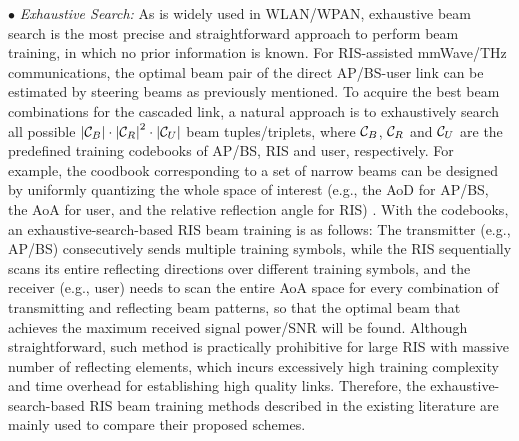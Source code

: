 \documentclass[journal,comsoc]{IEEEtran}
\begin{document}
$\bullet$ \emph{Exhaustive Search:} As is widely used in WLAN/WPAN, exhaustive beam search \cite{Fast-Beam-Training-IRS-2020,Terahertz-MIMO-RIS-2021,Distributed-Beam-Training-2021,Beam-Training-Alignment-RIS-2022,Fast-Beam-Training-Alignment-IRS-2022} is the most precise and straightforward approach to perform beam training, in which no prior information is known. For RIS-assisted mmWave/THz communications, the optimal beam pair of the direct AP/BS-user link can be estimated by steering beams as previously mentioned. To acquire the best beam combinations for the cascaded link, a natural approach is to exhaustively search all possible $\left| {{{\cal C}_B}} \right|\cdot {\left| {{{\cal C}_R}} \right|}^2 \cdot \left| {{{\cal C}_U}} \right|$ beam tuples/triplets, where ${\cal C}_B$, ${\cal C}_R$ and ${\cal C}_U$ are the predefined training codebooks of AP/BS, RIS and user, respectively. For example, the coodbook corresponding to a set of narrow beams can be designed by uniformly quantizing the whole space of interest (e.g., the AoD for AP/BS, the AoA for user, and the relative reflection angle for RIS) \cite{Beam-Training-Alignment-RIS-2022}. With the codebooks, an exhaustive-search-based RIS beam training is as follows: The transmitter (e.g., AP/BS) consecutively sends multiple training symbols, while the RIS sequentially scans its entire reflecting directions over different training symbols, and the receiver (e.g., user) needs to scan the entire AoA space for every combination of transmitting and reflecting beam patterns, so that the optimal beam that achieves the maximum received signal power/SNR will be found. Although straightforward, such method is practically prohibitive for large RIS with massive number of reflecting elements, which incurs excessively high training complexity and time overhead for establishing high quality links. Therefore, the exhaustive-search-based RIS beam training methods described in the existing literature are mainly used to compare their proposed schemes.
\end{document}
